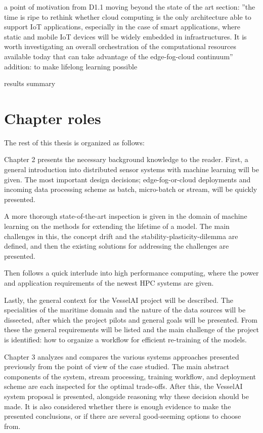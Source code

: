 a point of motivation from D1.1 moving beyond the state of the art section: ''the time is ripe  to  rethink  whether  cloud  computing  is  the  only  architecture  able  to  support  IoT  applications, especially  in  the  case  of  smart applications,  where  static  and  mobile  IoT  devices  will  be  widely embedded  in  infrastructures.  It  is  worth  investigating  an  overall  orchestration  of  the  computational resources  available  today  that  can  take  advantage  of  the  edge-fog-cloud  continuum'' addition: to make lifelong learning possible


results summary

\section{Chapter roles}


The rest of this thesis is organized as follows:

Chapter 2 presents the necessary background knowledge to the reader. First, a general introduction into distributed sensor systems with machine learning will be given. The most important design decisions; edge-fog-or-cloud deployments and incoming data processing scheme as batch, micro-batch or stream, will be quickly presented.

A more thorough state-of-the-art inspection is given in the domain of machine learning on the methods for extending the lifetime of a model. The main challenges in this, the concept drift and the stability-plasticity-dilemma are defined, and then the existing solutions for addressing the challenges are presented.

Then follows a quick interlude into high performance computing, where the power and application requirements of the newest HPC systems are given.

Lastly, the general context for the VesselAI project will be described. The specialities of the maritime domain and the nature of the data sources will be dissected, after which the project pilots and general goals will be presented. From these the general requirements will be listed and the main challenge of the project is identified: how to organize a workflow for efficient re-training of the models.

Chapter 3 analyzes and compares the various systems approaches presented previously from the point of view of the case studied. The main abstract components of the system, stream processing, training workflow, and deployment scheme are each inspected for the optimal trade-offs. After this, the VesselAI system proposal is presented, alongside reasoning why these decision should be made. It is also considered whether there is enough evidence to make the presented conclusions, or if there are several good-seeming options to choose from.

